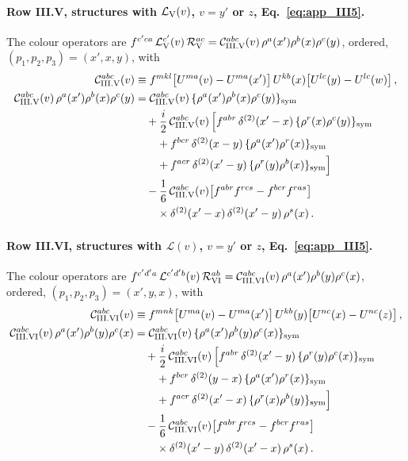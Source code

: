 \paragraph{Row III.V, structures with $\mathcal L_{\rm V}(v)$, $v=y'$ or $z$, Eq.~\eqref{eq:app_III5}.} The colour operators are $f^{c'ca}\,\mathcal L_{\rm V}^{c'}(v)\,\mathcal R_{\rm V}^{ac}=\mathcal C^{abc}_{\rm III.V}(v)\,\rho^a(x')\rho^b(x)\rho^c(y)$, ordered, $(p_1,p_2,p_3)=(x',x,y)$, with
\begin{align}
\mathcal C^{abc}_{\rm III.V}(v)&\equiv f^{mkl}\big[U^{ma}(v)-U^{ma}(x')\big]\,U^{kb}(x)\big[U^{lc}(y)-U^{lc}(w)\big]\,,\notag\\
\mathcal C^{abc}_{\rm III.V}(v)\,\rho^a(x')\rho^b(x)\rho^c(y)
&=\mathcal C^{abc}_{\rm III.V}(v)\,\{\rho^a(x')\rho^b(x)\rho^c(y)\}_{\rm sym}\notag\\
&\quad+\frac i2\,\mathcal C^{abc}_{\rm III.V}(v)\,\Big[f^{abr}\,\delta^{(2)}(x'-x)\,\{\rho^{r}(x)\rho^{c}(y)\}_{\rm sym}\notag\\
&\qquad+f^{bcr}\,\delta^{(2)}(x-y)\,\{\rho^{a}(x')\rho^{r}(x)\}_{\rm sym}\notag\\
&\qquad+f^{acr}\,\delta^{(2)}(x'-y)\,\{\rho^{r}(y)\rho^{b}(x)\}_{\rm sym}\Big]\notag\\
&\quad-\frac16\,\mathcal C^{abc}_{\rm III.V}(v)\big[f^{abr}f^{rcs}-f^{bcr}f^{ras}\big]\notag\\
&\qquad\times\delta^{(2)}(x'-x)\,\delta^{(2)}(x'-y)\,\rho^s(x)\,.\label{eq:app_sym_IIIV}
\end{align}
\paragraph{Row III.VI, structures with $\mathcal L(v)$, $v=y'$ or $z$, Eq.~\eqref{eq:app_III5}.} The colour operators are $f^{c'd'a}\,\mathcal L^{c'd'b}(v)\,\mathcal R_{\rm VI}^{ab}=\mathcal C^{abc}_{\rm III.VI}(v)\,\rho^a(x')\rho^b(y)\rho^c(x)$, ordered, $(p_1,p_2,p_3)=(x',y,x)$, with
\begin{align}
\mathcal C^{abc}_{\rm III.VI}(v)&\equiv f^{mnk}\big[U^{ma}(v)-U^{ma}(x')\big]\,U^{kb}(y)\big[U^{nc}(x)-U^{nc}(z)\big]\,,\notag\\
\mathcal C^{abc}_{\rm III.VI}(v)\,\rho^a(x')\rho^b(y)\rho^c(x)
&=\mathcal C^{abc}_{\rm III.VI}(v)\,\{\rho^a(x')\rho^b(y)\rho^c(x)\}_{\rm sym}\notag\\
&\quad+\frac i2\,\mathcal C^{abc}_{\rm III.VI}(v)\,\Big[f^{abr}\,\delta^{(2)}(x'-y)\,\{\rho^{r}(y)\rho^{c}(x)\}_{\rm sym}\notag\\
&\qquad+f^{bcr}\,\delta^{(2)}(y-x)\,\{\rho^{a}(x')\rho^{r}(x)\}_{\rm sym}\notag\\
&\qquad+f^{acr}\,\delta^{(2)}(x'-x)\,\{\rho^{r}(x)\rho^{b}(y)\}_{\rm sym}\Big]\notag\\
&\quad-\frac16\,\mathcal C^{abc}_{\rm III.VI}(v)\big[f^{abr}f^{rcs}-f^{bcr}f^{ras}\big]\notag\\
&\qquad\times\delta^{(2)}(x'-y)\,\delta^{(2)}(x'-x)\,\rho^s(x)\,.\label{eq:app_sym_IIIVI}
\end{align}
\par\endgroup

